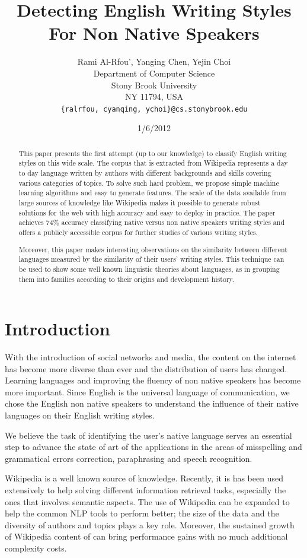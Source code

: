 \documentclass[11pt]{article}
\title{Detecting English Writing Styles For Non Native Speakers}
\author{Rami Al-Rfou', Yanging Chen, Yejin Choi \\
  Department of Computer Science \\
  Stony Brook University \\
  NY 11794, USA \\
  {\tt \{ralrfou, cyanqing, ychoi\}@cs.stonybrook.edu}}
\date{1/6/2012}
\begin{document}
\maketitle
\begin{abstract}
This paper presents the first attempt (up to our knowledge) to classify English
writing styles on this wide scale. The corpus that is extracted from Wikipedia
represents a day to
day language written by authors with different backgrounds and skills covering
various categories of topics. To solve such hard problem, we propose simple
machine learning algorithms and easy to generate features.
The scale of the data available from large sources of knowledge like Wikipedia
makes it possible to generate robust solutions for the web with high accuracy
and easy to deploy in practice.
The paper achieves 74\% accuracy classifying native versus non native speakers
writing styles and offers a publicly accessible corpus for further studies of
various writing styles.

Moreover, this paper makes interesting observations on the similarity between
different languages measured by the similarity of their users' writing styles.
This technique can be used to show some well known linguistic theories about
languages, as in grouping them into families according to their origins and
development history.

\end{abstract}

\section{Introduction}
With the introduction of social networks and media, the content on the internet 
has become more diverse than ever and the distribution of users has changed.
Learning languages and improving the fluency of non native speakers has
become more important. Since English is the universal language of communication, we chose the English
non native speakers to understand the influence of their
native languages on their English writing styles.

We believe the task of identifying the user's native language serves an essential
step to advance the state of art of the applications in the areas of misspelling and grammatical errors
correction, paraphrasing and speech recognition.

Wikipedia is a well known source of knowledge. Recently, it is has been used extensively
to help solving different information retrieval tasks, especially the ones
that involves semantic aspects\cite{Milne08aneffective}. The use of Wikipedia can be expanded to help the
common NLP tools to perform better; the size of the data and the diversity of
authors and topics plays a key role. Moreover, the sustained growth of Wikipedia
content of can bring performance gains with no much additional complexity costs.
\end{document}
